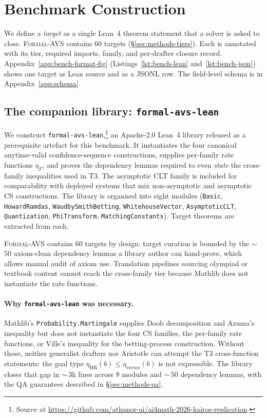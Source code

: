 \section{Benchmark Construction}
\label{sec:methods}

We define a \emph{target} as a single Lean~4 theorem statement that a
solver is asked to close. \textsc{Formal-AVS} contains $60$ targets
(\S\ref{sec:methods-tiers}). Each is annotated with its tier, required
imports, family, and per-drafter closure record.
Appendix~\ref{app:bench-format-fig}
(Listings~\ref{lst:bench-lean} and~\ref{lst:bench-json}) shows one
target as Lean source and as a JSONL row. The field-level schema is
in Appendix~\ref{app:schema}.

\subsection{The companion library: \texttt{formal-avs-lean}}

We construct \texttt{formal-avs-lean},\footnote{Source at
\url{https://github.com/athanor-ai/ai4math-2026-kairos-replication}.} an
Apache-2.0 Lean~4 library released as a prerequisite artefact for
this benchmark. It instantiates the four canonical anytime-valid
confidence-sequence constructions, supplies per-family rate
functions $\eta_F$, and proves the dependency lemmas required to
even \emph{state} the cross-family inequalities used in T3. The
asymptotic CLT family is included for comparability with deployed
systems that mix non-asymptotic and asymptotic CS constructions.
The library is organised into eight modules (\texttt{Basic},
\texttt{HowardRamdas}, \texttt{WaudbySmithBetting},
\texttt{WhitehouseVector}, \texttt{AsymptoticCLT},
\texttt{Quantization}, \texttt{PhiTransform},
\texttt{MatchingConstants}). Target theorems are extracted from
each.

\textsc{Formal-AVS} contains $60$ targets by design:
target curation is bounded by the $\sim$\,$50$ axiom-clean dependency
lemmas a library author can hand-prove, which allows manual audit of
axiom use. Translation pipelines sourcing olympiad or textbook
content cannot reach the cross-family tier because Mathlib does not
instantiate the rate functions.

\paragraph{Why \texttt{formal-avs-lean} was necessary.}
Mathlib's \texttt{Probability.Martingale} supplies Doob decomposition
and Azuma's inequality but does not instantiate the four CS families,
the per-family rate functions, or Ville's inequality for the
betting-process construction. Without those, neither generalist
drafters nor Aristotle can attempt the T3 cross-function statements:
the goal type $\eta_{\mathrm{HR}}(b) \leq \eta_{\mathrm{vector}}(b)$
is not expressible. The library closes that gap in
$\sim$\,$3$k lines across $8$ modules and $\sim$\,$50$ dependency
lemmas, with the QA guarantees described in
\S\ref{sec:methods-qa}.

